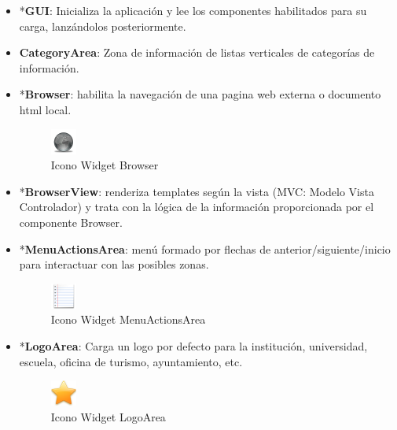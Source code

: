 \begin{itemize}
    \item{*\textbf{GUI}: Inicializa la aplicación y lee los componentes
    habilitados para su carga, lanzándolos posteriormente.}
 
    \item{\textbf{CategoryArea}: Zona de información de listas verticales de
    categorías de información.}  
     
    \newpage
    
    \item{*\textbf{Browser}: habilita la navegación de una pagina web externa o
    documento html local.
    
    \begin{figure}[ht]
        \begin{center}
            \includegraphics[height=32px]{src/img/widgets/browser.png}
            \caption[Icono Widget Browser] {Icono Widget Browser}
        \end{center}
    \end{figure}}
    
    \item{*\textbf{BrowserView}: renderiza templates según la vista (MVC: Modelo
    Vista Controlador) y trata con la lógica de la información proporcionada por
    el componente Browser.}


    \item{*\textbf{MenuActionsArea}: menú formado por flechas de
    anterior/siguiente/inicio para interactuar con las posibles zonas.
    
    \begin{figure}[ht]
        \begin{center}
            \includegraphics[height=32px]{src/img/widgets/menuactionsarea.png}
            \caption[Icono MenuActionsArea] {Icono Widget MenuActionsArea}
        \end{center}
    \end{figure}}

    \item{*\textbf{LogoArea}: Carga un logo por defecto para la institución,
    universidad, escuela, oficina de turismo, ayuntamiento, etc.
    
    \begin{figure}[ht]
        \begin{center}
            \includegraphics[height=32px]{src/img/widgets/logoarea.png}
            \caption[Icono LogoArea] {Icono Widget LogoArea}
        \end{center}
    \end{figure}}


\end{itemize}
